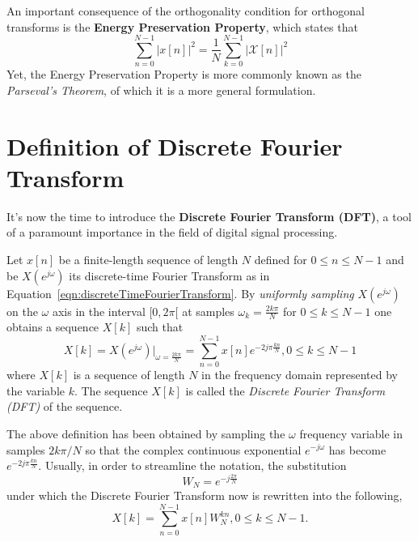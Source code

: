 \documentclass[\documentfontsize, twocolumn]{\classname}
\begin{document}
An important consequence of the orthogonality condition for orthogonal transforms is the \textbf{Energy Preservation Property}, which states that
\begin{equation}\label{eqn:energyPreservationProperty}
    \sum_{n=0}^{N-1}|x[n]|^2 = \frac 1 N \sum_{k=0}^{N-1}\left|\mathcal X[n]\right|^2
\end{equation}
Yet, the Energy Preservation Property is more commonly known as the \emph{Parseval's Theorem}, of which it is a more general formulation.

\section{Definition of Discrete Fourier Transform}

It's now the time to introduce the \textbf{Discrete Fourier Transform (DFT)}, a tool of a paramount importance in the field of digital signal processing.

\begin{defin}
    Let $x[n]$ be a finite-length sequence of length $N$ defined for $0 \leq n \leq N-1$ and be $X(e^{j\omega})$ its discrete-time Fourier Transform as in Equation~\ref{eqn:discreteTimeFourierTransform}. By \emph{uniformly sampling} $X(e^{j\omega})$ on the $\omega$ axis in the interval $[0, 2\pi[$ at samples $\omega_k=\frac{2k\pi}{N}$ for $0 \leq k \leq N-1$ one obtains a sequence $X[k]$ such that
    \begin{equation}\label{eqn:discreteFourierTransform}
        X[k] = X(e^{j\omega})\Bigr\rvert_{\omega = \frac {2k\pi}{N}} = \sum_{n=0}^{N-1} x[n] e^{-2j\pi \frac{k n}{N}}, 0 \leq k \leq N-1
    \end{equation}
    where $X[k]$ is a sequence of length $N$ in the frequency domain represented by the variable $k$. The sequence $X[k]$ is called the \emph{Discrete Fourier Transform (DFT)} of the sequence.
\end{defin}

The above definition has been obtained by sampling the $\omega$ frequency variable in samples $2k\pi / N$ so that the complex continuous exponential $e^{-j\omega}$ has become $e^{-2j\pi \frac{kn}{N}}$. Usually, in order to streamline the notation, the substitution
\begin{equation}\label{eqn:dftNotationWn}
    W_N = e^{-j\frac{2\pi}{N}}
\end{equation}
under which the Discrete Fourier Transform now is rewritten into the following,
\begin{equation}\label{eqn:discreteTimeFourierTransformWn}
        X[k] = \sum_{n=0}^{N-1} x[n] W_N^{kn}, 0 \leq k \leq N-1.
\end{equation}
\end{document}

